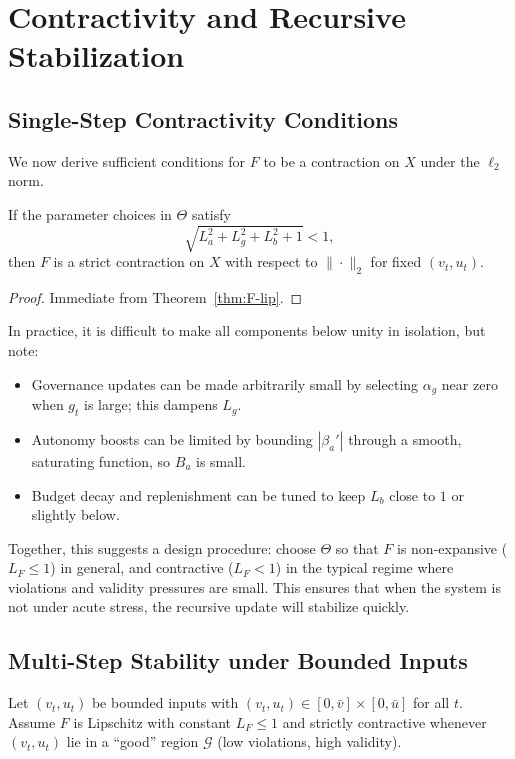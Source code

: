\documentclass[11pt]{article}
\begin{document}
\section{Contractivity and Recursive Stabilization}

\subsection{Single-Step Contractivity Conditions}

We now derive sufficient conditions for $F$ to be a contraction on $X$ under the $\ell_2$ norm.

\begin{corollary}
\label{cor:contraction}
If the parameter choices in $\Theta$ satisfy
\[
  \sqrt{L_a^2 + L_g^2 + L_b^2 + 1} < 1,
\]
then $F$ is a strict contraction on $X$ with respect to $\|\cdot\|_2$ for fixed $(v_t,u_t)$.
\end{corollary}

\begin{proof}
Immediate from Theorem~\ref{thm:F-lip}.
\end{proof}

In practice, it is difficult to make all components below unity in isolation, but note:
\begin{itemize}
  \item Governance updates can be made arbitrarily small by selecting $\alpha_g$ near zero when $g_t$ is large; this dampens $L_g$.
  \item Autonomy boosts can be limited by bounding $|\beta_a'|$ through a smooth, saturating function, so $B_a$ is small.
  \item Budget decay and replenishment can be tuned to keep $L_b$ close to $1$ or slightly below.
\end{itemize}
Together, this suggests a design procedure: choose $\Theta$ so that $F$ is non-expansive ($L_F \le 1$) in general, and contractive ($L_F < 1$) in the typical regime where violations and validity pressures are small.
This ensures that when the system is not under acute stress, the recursive update will stabilize quickly.

\subsection{Multi-Step Stability under Bounded Inputs}

Let $(v_t,u_t)$ be bounded inputs with $(v_t,u_t) \in [0,\bar{v}] \times [0,\bar{u}]$ for all $t$.
Assume $F$ is Lipschitz with constant $L_F \le 1$ and strictly contractive whenever $(v_t,u_t)$ lie in a ``good'' region $\mathcal{G}$ (low violations, high validity).
\end{document}
